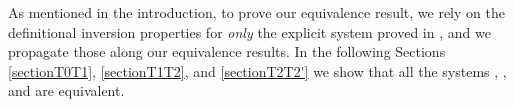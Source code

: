 As mentioned in the introduction, to prove our equivalence result, we rely on the definitional inversion properties for \textit{only} the explicit system
\ThyGAT proved in , and we propagate those along our equivalence results.
In the following Sections \ref{sectionT0T1}, \ref{sectionT1T2}, and \ref{sectionT2T2'} we show that all the systems \ThyGAT, \ThyTarski, \ThyRussell and \ThyPTS are equivalent.
